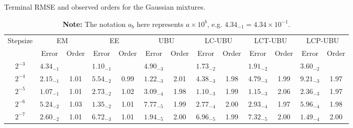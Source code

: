 \documentclass[12pt]{article}
\numberwithin{equation}{section}
\begin{document}
\begin{table}[!tbp]
\centering
\caption{Terminal RMSE and observed orders for the Gaussian mixtures.}
\small
\setlength{\tabcolsep}{3.5pt}
\begin{tabular}{ccccccccccccc}
\toprule
Stepsize & \multicolumn{2}{c}{EM} & \multicolumn{2}{c}{EE} & \multicolumn{2}{c}{UBU} & \multicolumn{2}{c}{LC-UBU} & \multicolumn{2}{c}{LCT-UBU} & \multicolumn{2}{c}{LCP-UBU} \\
\cmidrule(lr){2-3}\cmidrule(lr){4-5}\cmidrule(lr){6-7}\cmidrule(lr){8-9}\cmidrule(lr){10-11}\cmidrule(lr){12-13}
 & Error & Order & Error & Order & Error & Order & Error & Order & Error & Order & Error & Order \\
\midrule
$2^{-3}$   & $4.34_{-1}$ &   & $1.10_{-1}$ &  & $4.90_{-3}$ &   & $1.73_{-2}$ &   & $1.91_{-2}$ &   & $3.60_{-2}$ &   \\
$2^{-4}$  & $2.15_{-1}$ & 1.01 & $5.54_{-2}$ & 0.99 & $1.22_{-3}$ & 2.01 & $4.38_{-3}$ & 1.98 & $4.79_{-3}$ & 1.99 & $9.21_{-3}$ & 1.97 \\
$2^{-5}$  & $1.07_{-1}$ & 1.01 & $2.73_{-2}$ & 1.02 & $3.09_{-4}$ & 1.98 & $1.10_{-3}$ & 1.99 & $1.15_{-3}$ & 2.06 & $2.36_{-3}$ & 1.97 \\
$2^{-6}$  & $5.24_{-2}$ & 1.03 & $1.35_{-2}$ & 1.01 & $7.77_{-5}$ & 1.99 & $2.77_{-4}$ & 2.00 & $2.93_{-4}$ & 1.97 & $5.96_{-4}$ & 1.98 \\
$2^{-7}$ & $2.60_{-2}$ & 1.01 & $6.72_{-3}$ & 1.01 & $1.94_{-5}$ & 2.00 & $6.96_{-5}$ & 1.99 & $7.32_{-5}$ & 2.00 & $1.49_{-4}$ & 2.00 \\
\bottomrule
\end{tabular}
\vspace{0.5em}
\caption*{\footnotesize\centering \textbf{Note:} 
The notation $a_b$ here represents $a \times 10^b$, e.g. $4.34_{-1}=4.34\times 10^{-1}$.}
\label{tab:gmm-six-methods-error}
\end{table}


\end{document}
